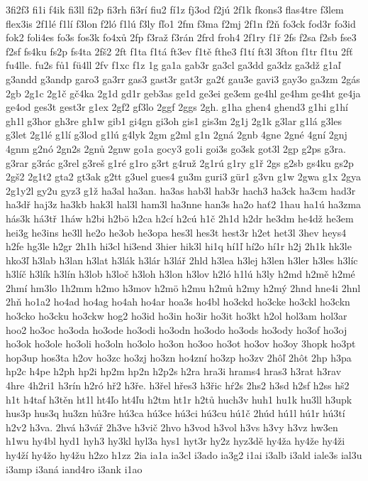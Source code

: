 {3fi2f3
fi1i
f4ik
fi3ll
fi2p
fi3rh
fi3rí
fiu2
fí1z
fj3od
f2jú
2f1k
fkons3
flas4tre
f3lem
flex3is
2f1lé
f1lí
f3lon
f2ló
f1lú
f3ly
fľo1
2fm
f3ma
f2mj
2f1n
f2ň
fo3ck
fod3r
fo3id
fok2
foli4es
fo3s
fos3k
fo4xů
2fp
f3raž
f3rán
2frd
froh4
2f1ry
f1ř
2fs
f2sa
f2sb
fse3
f2sf
fs4ku
fs2p
fs4ta
2fš2
2ft
f1ta
f1tá
ft3ev
f1tě
fthe3
f1tí
ft3l
3fton
f1tr
f1tu
2fť
fu4lle.
fu2s
fů1
fü4ll
2fv
f1xc
f1z
1g
ga1a
gab3r
ga3cl
ga3dd
ga3dz
ga3dž
g1aľ
g3andd
g3andp
garo3
ga3rr
gas3
gast3r
gat3r
ga2ť
gau3e
gavi3
gay3o
ga3zm
2gás
2gb
2g1c
2g1č
gč4ka
2g1d
gd1r
geb3as
ge1d
ge3ei
ge3em
ge4hl
ge4hm
ge4ht
ge4ja
ge4od
ges3t
gest3r
g1ex
2gf2
gf3lo
2ggf
2ggs
2gh.
g1ha
ghen4
ghend3
g1hi
g1hí
gh1l
g3hor
gh3re
gh1w
gib1
gi4gn
gi3oh
gis1
gis3m
2g1j
2g1k
g3lar
g1lá
g3les
g3let
2g1lé
g1lí
g3lod
g1lú
g4lyk
2gm
g2ml
g1n
2gná
2gnb
4gne
2gné
4gní
2gnj
4gnm
g2nó
2gn2s
2gnů
2gnw
go1a
gocy3
go1i
goi3s
go3sk
got3l
2gp
g2ps
g3ra.
g3rar
g3rác
g3rel
g3reš
g1ré
g1ro
g3rt
g4ruž
2g1rú
g1ry
g1ř
2gs
g2sb
gs4ku
gs2p
2gš2
2g1t2
gta2
gt3ak
g2tt
g3uel
gues4
gu3m
guri3
gür1
g3vn
g1w
2gwa
g1x
2gya
2g1y2l
gy2u
gyz3
g1ž
ha3al
ha3an.
ha3as
hab3l
hab3r
hach3
ha3ck
ha3cm
had3r
ha3dř
haj3z
ha3kb
hak3l
hal3l
ham3l
ha3nne
han3s
ha2o
hať2
1hau
ha1ú
ha3zma
hás3k
há3tř
1háw
h2bi
h2bö
h2ca
h2cí
h2cú
h1č
2h1d
h2dr
he3dm
he4dž
he3em
hei3g
he3ins
he3ll
he2o
he3ob
he3opa
hes3l
hes3t
hest3r
h2et
het3l
3hev
heys4
h2fe
hg3le
h2gr
2h1h
hi3cl
hi3end
3hier
hik3l
hi1q
hí1ľ
hí2o
hí1r
h2j
2h1k
hk3le
hko3ľ
h3lab
h3lan
h3lat
h3lák
h3lár
h3lář
2hld
h3lea
h3lej
h3len
h3ler
h3les
h3líc
h3líč
h3lík
h3lín
h3lob
h3loč
h3loh
h3lon
h3lov
h2ló
h1lú
h3ly
h2md
h2mě
h2mé
2hmí
hm3lo
1h2mm
h2mo
h3mov
h2mö
h2mu
h2mů
h2my
h2mý
2hnd
hne4i
2hnl
2hň
ho1a2
ho4ad
ho4ag
ho4ah
ho4ar
hoa3s
ho4bl
ho3ckd
ho3cke
ho3ckl
ho3ckn
ho3cko
ho3cku
ho3ckw
hog2
ho3id
ho3in
ho3ir
ho3it
ho3kt
h2ol
hol3am
hol3ar
hoo2
ho3oc
ho3oda
ho3ode
ho3odi
ho3odn
ho3odo
ho3ods
ho3ody
ho3of
ho3oj
ho3ok
ho3ole
ho3oli
ho3oln
ho3olo
ho3on
ho3oo
ho3ot
ho3ov
ho3oy
3hopk
ho3pt
hop3up
hos3ta
h2ov
ho3zc
ho3zj
ho3zn
ho4zní
ho3zp
ho3zv
2hôľ
2hôt
2hp
h3pa
hp2c
h4pe
h2ph
hp2i
hp2m
hp2n
h2p2s
h2ra
hra3i
hrams4
hras3
h3rat
h3rav
4hre
4h2ri1
h3rín
h2ró
hř2
h3ře.
h3řel
hřes3
h3řic
hŕ2s
2hs2
h3sd
h2sf
h2ss
hš2
h1t
h4taf
h3těn
ht1l
ht4ľo
ht4ľu
h2tm
ht1r
h2tů
huch3v
huh1
hu1k
hu3ll
h3upk
hus3p
hus3q
hu3zn
hů3re
hú3ca
hú3ce
hú3ci
hú3cu
hú1č
2húd
hú1l
hú1r
hú3tí
h2v2
h3va.
2hvá
h3vář
2h3ve
h3vič
2hvo
h3vod
h3vol
h3vs
h3vy
h3vz
hw3en
h1wu
hy4bl
hyd1
hyh3
hy3kl
hyl3a
hys1
hyt3r
hy2z
hyz3dě
hy4ža
hy4že
hy4ži
hy4ží
hy4žo
hy4žu
h2zo
h1zz
2ia
ia1a
ia3cl
i3ado
ia3g2
i1ai
i3alb
i3ald
iale3s
ial3u
i3amp
i3aná
iand4ro
i3ank
i1ao
}
